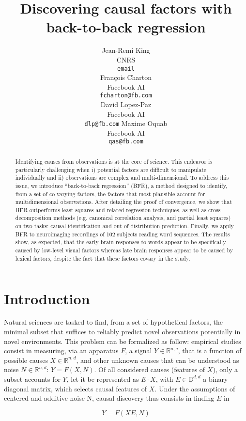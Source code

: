 \documentclass{article}
\title{Discovering causal factors with back-to-back regression}
\author{%
  Jean-Remi King\\
  CNRS\\
  \texttt{email} \\
  \And
  Fran\c{c}ois Charton\\
  Facebook AI\\
  \texttt{fcharton@fb.com}\\
  \And
  David Lopez-Paz\\
  Facebook AI\\
  \texttt{dlp@fb.com}
  \And
  Maxime Oquab\\
  Facebook AI\\
  \texttt{qas@fb.com}
}
\begin{document}
\maketitle

\begin{abstract}
Identifying causes from observations is at the core of science. This endeavor
is particularly challenging when i) potential factors are difficult to
manipulate individually and ii) observations are complex and multi-dimensional.
To address this issue, we introduce ``back-to-back regression'' (BFR), a
method designed to identify, from a set of co-varying factors, the factors
that most plausible account for multidimensional observations. After detailing
the proof of convergence, we show that BFR outperforms least-squares and related
regression techniques, as well as cross-decomposition methods (e.g. canonical
correlation analysis, and partial least squares) on two tasks: causal
identification and out-of-distribution prediction. Finally, we apply BFR to
neuroimaging recordings of 102 subjects reading word sequences. The results
show, as expected, that the early brain responses to words appear to be
specifically caused by low-level visual factors whereas late brain responses
appear to be caused by lexical factors, despite the fact that these factors
covary in the study.
\end{abstract}

\section{Introduction}

Natural sciences are tasked to find, from a set of hypothetical factors, the minimal subset that suffices to reliably predict novel observations potentially in novel environments.
%
This problem can be formalized as follow: empirical studies consist in measuring, via an apparatus $F$, a signal $Y \in \mathbb{R}^{n, q}$, that is a function of possible causes $X \in \mathbb{R}^{n, d}$, and other unknown causes that can be understood as noise $N \in \mathbb{R}^{n, d}$: $Y=F(X,N)$. Of all considered causes (features of $X$), only a subset accounts for $Y$, let it be represented as $E \cdot X$, with $E \in \mathbb{D}^{d, d}$ a binary diagonal matrix, which selects causal features of $X$.
%
Under the assumptions of centered and additive noise N, causal discovery thus consists in finding $E$ in

\begin{equation}
    Y=F(XE, N)
\end{equation}
\end{document}
